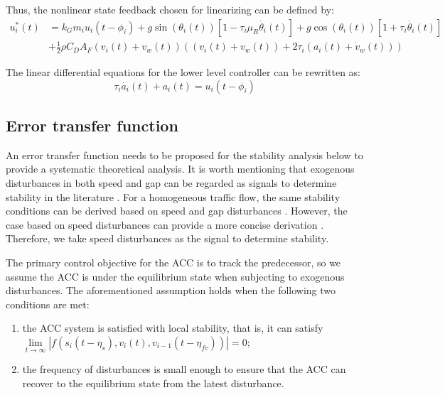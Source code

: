 \documentclass[a4paper]{cas-sc}
\begin{document}
Thus, the nonlinear state feedback chosen for linearizing can be defined by:
\begin{equation}
  \begin{aligned}
    u_i^\ast\left(t\right) & =k_Gm_iu_i\left(t-\phi_i\right)+g\sin{\left(\theta_i\left(t\right)\right)}\left[1-\tau_i\mu_R\dot{\theta_i}\left(t\right)\right]+g\cos{\left(\theta_i\left(t\right)\right)}\left[1+\tau_i\dot{\theta_i}\left(t\right)\right] \\
                           & +\frac{1}{2}\rho C_DA_F\left(v_i\left(t\right)+v_w\left(t\right)\right)\left(\left(v_i\left(t\right)+v_w\left(t\right)\right)+2\tau_i(a_i\left(t\right)+\dot{v}_{w}\left(t\right))\right)
  \end{aligned}
  \label{Eq18}
\end{equation}

The linear differential equations for the lower level controller can be rewritten as:
\begin{equation}
  \tau_i\dot{a_i}\left(t\right)+a_i\left(t\right)=u_i(t-\phi_i)
  \label{Eq19}
\end{equation}



\subsection{Error transfer function}
\label{Section 4.2}

An error transfer function needs to be proposed for the stability analysis below to provide a systematic theoretical analysis. It is worth mentioning that exogenous disturbances in both speed and gap can be regarded as signals to determine stability in the literature \citep{Feng2019,Qin2018,Navas2019,Jin2014}. For a homogeneous traffic flow, the same stability conditions can be derived based on speed and gap disturbances \citep{Montanino2021,Montanino2021a,Zheng2015}. However, the case based on speed disturbances can provide a more concise derivation \citep{Wang2018a}. Therefore, we take speed disturbances as the signal to determine stability.

The primary control objective for the ACC is to track the predecessor, so we assume the ACC is under the equilibrium state when subjecting to exogenous disturbances. The aforementioned assumption holds when the following two conditions are met:
\begin{enumerate}
  \item the ACC system is satisfied with local stability, that is, it can satisfy $\mathop {\lim }\limits_{t \to \infty } \left| {f\left( {{s_i}\left( {t - {\eta _s}} \right),{v_i}(t),{v_{i - 1}}\left( {t - {\eta _{fv}}} \right)} \right)} \right| = 0$;
  \item the frequency of disturbances is small enough to ensure that the ACC can recover to the equilibrium state from the latest disturbance.
\end{enumerate}
\end{document}
